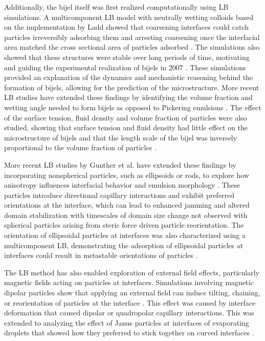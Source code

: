 Additionally, the bijel itself was first realized computationally using LB simulations. \cite{stratford_colloidal_2005} A multicomponent LB model with neutrally wetting colloids based on the 
implementation by Ladd showed that coarsening interfaces could catch particles irreversibly adsorbing them and arresting coarsening once the interfacial area matched the cross sectional area of 
particles adsorbed \cite{stratford_colloidal_2005,ladd_numerical_1994}. The simulations also showed that these structures were stable over long periods of time, motivating and guiding the 
experimental realization of bijels in 2007 \cite{herzig_bicontinuous_2007}. These simulations provided an explanation of the dynamics and mechanistic reasoning behind the formation of bijels, 
allowing for the prediction of the microstructure. More recent LB studies have extended these findings by identifying the volume fraction and wetting angle needed to form bijels as opposed to 
Pickering emulsions \cite{jansen_bijels_2011}. The effect of the surface tension, fluid density and volume fraction of particles were also studied, showing that surface tension and fluid density 
had little effect on the microstructure of bijels and that the length scale of the bijel was inversely proportional to the volume fraction of particles \cite{jansen_bijels_2011}.

More recent LB studies by Gunther et al. have extended these findings by incorporating nonspherical particles, such as ellipsoids or rods, to explore how anisotropy influences interfacial behavior 
and emulsion morphology \cite{gunther_timescales_2014}. These particles introduce directional capillary interactions and exhibit preferred orientations at the interface, which can lead to enhanced 
jamming and altered domain stabilization with timescales of domain size change not observed with spherical particles arising from steric force driven particle reorientation. The orientation of 
ellipsoidal particles at interfaces was also characterized using a multicomponent LB, demonstrating the adsorption of ellipsoidal particles at interfaces could result in metastable orientations of 
particles \cite{gunther_lattice_2013}.

The LB method has also enabled exploration of external field effects, particularly magnetic fields acting on particles at interfaces. Simulations involving magnetic dipolar particles show that 
applying an external field can induce tilting, chaining, or reorientation of particles at the interface \cite{davies_interface_2014, davies_assembling_2014}. This effect was caused by interface 
deformation that caused dipolar or quadropolar capillary interactions. This was extended to analyzing the effect of Janus particles at interfaces of evaporating droplets that showed how they preferred 
to stick together on curved interfaces \cite{xie_direct_2017}.

